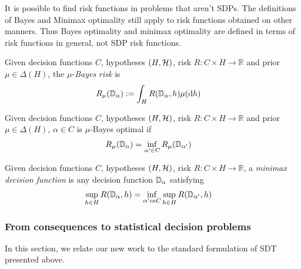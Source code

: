 It is possible to find risk functions in problems that aren't SDPs. The definitions of Bayes and Minimax optimality still apply to risk functions obtained on other manners. Thus Bayes optimality and minimax optimality are defined in terms of risk functions in general, not SDP risk functions.

\begin{definition}
Given decision functions $C$, hypotheses $(H,\mathcal{H})$, risk $R:C\times H\to \mathbb{R}$ and prior $\mu\in \Delta(H)$, the $\mu$-\emph{Bayes risk} is
\begin{align}
    R_\mu(\mathbb{D}_\alpha) &:= \int_{H} R(\mathbb{D}_\alpha,h)\mu(\mathrm{d}h)
\end{align}
\end{definition}

\begin{definition}
Given decision functions $C$, hypotheses $(H,\mathcal{H})$, risk $R:C\times H\to \mathbb{R}$ and prior $\mu\in \Delta(H)$, $\alpha\in C$ is $\mu$-Bayes optimal if
\begin{align}
    R_\mu(\mathbb{D}_\alpha) &= \inf_{\alpha'\in C} R_{\mu}(\mathbb{D}_{\alpha'})
\end{align}
\end{definition}

\begin{definition}
Given decision functions $C$, hypotheses $(H,\mathcal{H})$, risk $R:C\times H\to \mathbb{R}$, a \emph{minimax decision function} is any decision function $\mathbb{D}_\alpha$ satisfying
\begin{align}
    \sup_{h\in H}  R(\mathbb{D}_\alpha,h) &= \inf_{\alpha' in C} \sup_{h\in H} R(\mathbb{D}_{\alpha'},h)
\end{align}
\end{definition}

\subsubsection{From consequences to statistical decision problems}\label{sec:cons_to_sdp}

In this section, we relate our new work to the standard formulation of SDT presented above.

